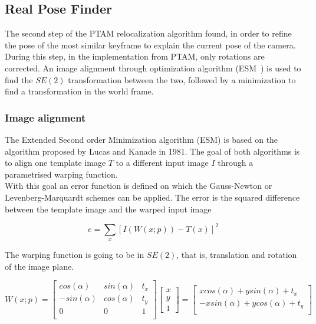 \subsection{Real Pose Finder}
\label{sub:real_pose_finder}

The second step of the PTAM relocalization algorithm found, in order to refine the pose of the most similar keyframe to explain the current pose of the camera. During this step, in the implementation from PTAM, only rotations are corrected. An image alignment through optimization algorithm (ESM~\cite{lovegrove2012parametric}) is used to find the $SE(2)$ transformation between the two, followed by a minimization to find a transformation in the world frame.\\

\subsubsection{Image alignment}
\label{ssub:image_alignment}

The Extended Second order Minimization algorithm (ESM) is based on the algorithm proposed by Lucas and Kanade \cite{Baker2004} in 1981. The goal of both algorithms is to align one template image $T$ to a different input image $I$ through a parametrised warping function. \\

With this goal an error function is defined on which the Gauss-Newton or Levenberg-Marquardt schemes can be applied. The error is the squared difference between the template image and the warped input image

\begin{equation}
  e = \sum_x [I(W(x;p)) - T(x)]^2
\end{equation}

The warping function is going to be in $SE(2)$, that is, translation and rotation of the image plane.

\begin{equation}
  W(x;p) = 
  \begin{bmatrix}
    cos (\alpha) & sin(\alpha) & t_x\\
    -sin(\alpha) & cos(\alpha) & t_y\\
    0 & 0 & 1 \\
  \end{bmatrix}
  \begin{bmatrix} x \\ y \\ 1 \end{bmatrix}
    =
  \begin{bmatrix}
    xcos(\alpha) + y sin(\alpha) + t_x \\
    -x sin(\alpha) + y cos(\alpha) + t_y \\
  \end{bmatrix}
  \label{eq:se2_warp_function}
\end{equation}


